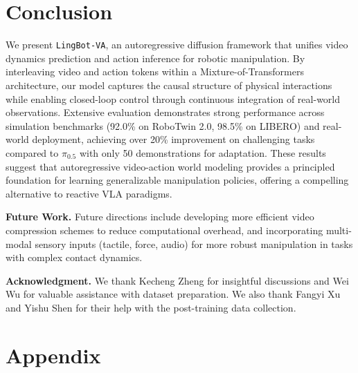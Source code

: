 \documentclass[onecolumn]{robbyant}           %
\newcommand\methodname{LingBot-VA}
\newcommand{\method}{\texttt{\methodname}\xspace}
\begin{document}
\section{Conclusion}\label{sec:conclusion}

We present \method, an autoregressive diffusion framework that unifies video dynamics prediction and action inference for robotic manipulation.
By interleaving video and action tokens within a Mixture-of-Transformers architecture, our model captures the causal structure of physical interactions while enabling closed-loop control through continuous integration of real-world observations.
Extensive evaluation demonstrates strong performance across simulation benchmarks (92.0\% on RoboTwin 2.0, 98.5\% on LIBERO) and real-world deployment, achieving over 20\% improvement on challenging tasks compared to $\pi_{0.5}$ with only 50 demonstrations for adaptation.
These results suggest that autoregressive video-action world modeling provides a principled foundation for learning generalizable manipulation policies, offering a compelling alternative to reactive VLA paradigms.

\noindent\textbf{Future Work.}
Future directions include developing more efficient video compression schemes to reduce computational overhead, and incorporating multi-modal sensory inputs (tactile, force, audio) for more robust manipulation in tasks with complex contact dynamics.


\noindent\textbf{Acknowledgment.}
We thank Kecheng Zheng for insightful discussions and Wei Wu for valuable assistance with dataset preparation.
We also thank Fangyi Xu and Yishu Shen for their help with the post-training data collection.



{
\small


}



\appendix
\renewcommand\thesection{\Alph{section}}
\renewcommand\thefigure{S\arabic{figure}}
\renewcommand\thetable{S\arabic{table}}
\renewcommand\theequation{S\arabic{equation}}
\setcounter{figure}{0}
\setcounter{table}{0}
\setcounter{equation}{0}


\section*{Appendix}
\end{document}
